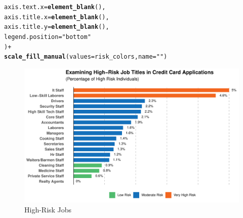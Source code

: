 \documentclass{article}\usepackage[]{graphicx}\usepackage[]{xcolor}
\makeatletter
\def\maxwidth{ %
  \ifdim\Gin@nat@width>\linewidth
    \linewidth
  \else
    \Gin@nat@width
  \fi
}
\newcommand{\hlsng}[1]{\textcolor[rgb]{0.192,0.494,0.8}{#1}}%
\newcommand{\hlopt}[1]{\textcolor[rgb]{0,0,0}{#1}}%
\newcommand{\hldef}[1]{\textcolor[rgb]{0.345,0.345,0.345}{#1}}%
\newcommand{\hlkwc}[1]{\textcolor[rgb]{0.333,0.667,0.333}{#1}}%
\newcommand{\hlkwd}[1]{\textcolor[rgb]{0.737,0.353,0.396}{\textbf{#1}}}%
\newenvironment{kframe}{%
 \def\at@end@of@kframe{}%
 \ifinner\ifhmode%
  \def\at@end@of@kframe{\end{minipage}}%
  \begin{minipage}{\columnwidth}%
 \fi\fi%
 \def\FrameCommand##1{\hskip\@totalleftmargin \hskip-\fboxsep
 \colorbox{shadecolor}{##1}\hskip-\fboxsep
     \hskip-\linewidth \hskip-\@totalleftmargin \hskip\columnwidth}%
 \MakeFramed {\advance\hsize-\width
   \@totalleftmargin\z@ \linewidth\hsize
   \@setminipage}}%
 {\par\unskip\endMakeFramed%
 \at@end@of@kframe}
\newenvironment{knitrout}{}{} %
\makeatother
\begin{document}
\begin{knitrout}
\begin{kframe}
\begin{alltt}
    \hlkwc{axis.text.x} \hldef{=} \hlkwd{element_blank}\hldef{(),}
    \hlkwc{axis.title.x} \hldef{=} \hlkwd{element_blank}\hldef{(),}
    \hlkwc{axis.title.y} \hldef{=} \hlkwd{element_blank}\hldef{(),}
    \hlkwc{legend.position} \hldef{=} \hlsng{"bottom"}
  \hldef{)} \hlopt{+}
  \hlkwd{scale_fill_manual}\hldef{(}\hlkwc{values} \hldef{= risk_colors,} \hlkwc{name} \hldef{=} \hlsng{""}\hldef{)}
\end{alltt}
\end{kframe}\begin{figure}[H]
\includegraphics[width=\maxwidth]{figure/unnamed-chunk-44-1} \caption[High-Risk Jobs]{High-Risk Jobs}\label{fig:unnamed-chunk-44}
\end{figure}

\end{knitrout}
\end{document}
